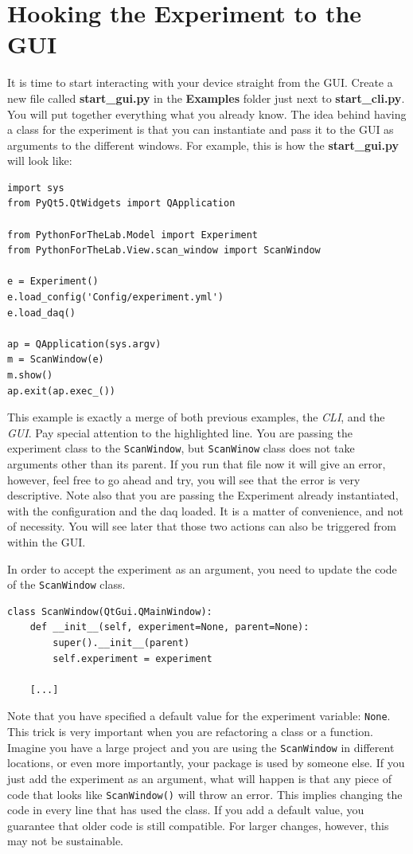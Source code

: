 \section{Hooking the Experiment to the GUI}\label{hooking-the-experiment-to-the-gui}
It is time to start interacting with your device straight from the
{GUI}. Create a new file called \textbf{start\_gui.py} in the
\textbf{Examples} folder just next to \textbf{start\_cli.py}. You will
put together everything what you already know. The idea behind having a
class for the experiment is that you can instantiate and pass it to the
{GUI} as arguments to the different windows. For example, this is how
the \textbf{start\_gui.py} will look like:

\begin{verbatim}
import sys
from PyQt5.QtWidgets import QApplication

from PythonForTheLab.Model import Experiment
from PythonForTheLab.View.scan_window import ScanWindow

e = Experiment()
e.load_config('Config/experiment.yml')
e.load_daq()

ap = QApplication(sys.argv)
m = ScanWindow(e)
m.show()
ap.exit(ap.exec_())
\end{verbatim}

This example is exactly a merge of both previous examples, the
\emph{CLI}, and the \emph{GUI}. Pay special attention to the
highlighted line. You are passing the experiment class to the
\texttt{ScanWindow}, but \texttt{ScanWinow} class does not take
arguments other than its parent. If you run that file now it will give
an error, however, feel free to go ahead and try, you will see that the
error is very descriptive. Note also that you are passing the Experiment
already instantiated, with the configuration and the daq loaded. It is a
matter of convenience, and not of necessity. You will see later that
those two actions can also be triggered from within the {GUI}.

In order to accept the experiment as an argument, you need to update the
code of the \texttt{ScanWindow} class.

\begin{verbatim}
class ScanWindow(QtGui.QMainWindow):
    def __init__(self, experiment=None, parent=None):
        super().__init__(parent)
        self.experiment = experiment
    
    [...]
\end{verbatim}

Note that you have specified a default value for the experiment
variable: \texttt{None}. This trick is very important when you are
refactoring a class or a function. Imagine you have a large project and
you are using the \texttt{ScanWindow} in different locations, or even
more importantly, your package is used by someone else. If you just add
the experiment as an argument, what will happen is that any piece of
code that looks like \texttt{ScanWindow()} will throw an error. This
implies changing the code in every line that has used the class. If you
add a default value, you guarantee that older code is still compatible.
For larger changes, however, this may not be sustainable.

